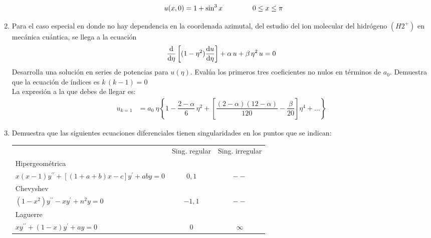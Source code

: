\documentclass[12pt]{article}
\newcommand{\pderivada}[1]{\ensuremath{{#1}^{\prime}}}
\newcommand{\sderivada}[1]{\ensuremath{{#1}^{\prime \prime}}}
\begin{document}
\begin{enumerate}
\begin{enumerate}
\begin{align*}
    u (x, 0) &= 1 + \sin^{3} x \hspace{1.5cm} 0 \leq x \leq \pi
\end{align*}
\end{enumerate}
\item Para el caso especial en donde no hay dependencia en la coordenada azimutal, del estudio del ion molecular del hidrógeno $(H2^{+})$ en mecánica cuántica, se llega a la ecuación
\begin{align*}
\dv{\eta} \left[ (1 - \eta^{2} ) \dv{u}{\eta} \right] + \alpha \, u + \beta \, \eta^{2} \, u = 0
\end{align*}
Desarrolla una solución en series de potencias para $u(\eta)$. Evalúa los primeros tres coeficientes no nulos en términos de $a_{0}$. Demuestra que la ecuación de índices es $k \, (k - 1) = 0$
\\
La expresión a la que debes de llegar es:
\begin{align*}
u_{k=1} &=  a_{0} \: \eta \left\lbrace 1 - \dfrac{2- \alpha}{6} \, \eta^{2} + \left[ \dfrac{(2-\alpha)(12-\alpha)}{120} - \dfrac{\beta}{20} \right] \eta^{4} + \ldots \right\rbrace
\end{align*}
\item Demuestra que las siguientes ecuaciones diferenciales tienen singularidades en los puntos que se indican:
\begin{table}[H]
\centering
\begin{tabular}{l c c}
 & Sing. regular & Sing. irregular \\
Hipergeométrica & & \\
$x (x-1) \sderivada{y} + [(1 + a + b) x - c] \pderivada{y} + a b y = 0$ & $0, 1$ & $--$ \\
Chevyshev & & \\
$(1 - x^{2}) \sderivada{y} - x \pderivada{y} + n^{2} y = 0$ & $- 1, 1$ & $--$ \\
Laguerre & & \\
$x \sderivada{y} + (1 - x) \pderivada{y} + a y = 0$ & $0$ & $\infty$
\end{tabular}
\end{table}

\end{enumerate}
\end{document}
